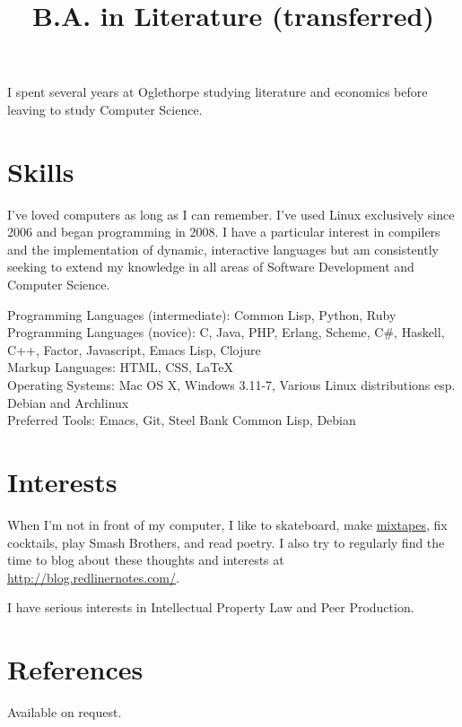 \documentclass[margintitle,line]{res}
\begin{document}
\begin{resume}
\title{B.A. in Literature (transferred)}
\begin{position}
  I spent several years at Oglethorpe studying literature
  and economics before leaving to study Computer Science.
\end{position}


\setlength{\parskip}{1ex}


\section{Skills}

I've loved computers as long as I can remember. I've used Linux exclusively
since 2006 and began programming in 2008. I have a particular interest in
compilers and the implementation of dynamic, interactive languages but am
consistently seeking to extend my knowledge in all areas of Software Development
and Computer Science.

Programming Languages (intermediate): Common Lisp, Python, Ruby \\
Programming Languages (novice): C, Java, PHP, Erlang, Scheme, C\#, Haskell,
C++, Factor, Javascript, Emacs Lisp, Clojure \\
Markup Languages: HTML, CSS, LaTeX \\
Operating Systems: Mac OS X, Windows 3.11-7, Various Linux distributions
esp. Debian and Archlinux \\
Preferred Tools: Emacs, Git, Steel Bank Common Lisp, Debian \\


\section{Interests}

When I'm not in front of my computer, I like to skateboard, make
\href{http://soundcloud.com/redlinernotes}{mixtapes}, fix cocktails,
play Smash Brothers, and read poetry. I also try to regularly find the
time to blog about these thoughts and interests at \url{http://blog.redlinernotes.com/}.

I have serious interests in Intellectual Property Law and Peer Production.


\section{References}

Available on request.

\end{resume}
\end{document}

